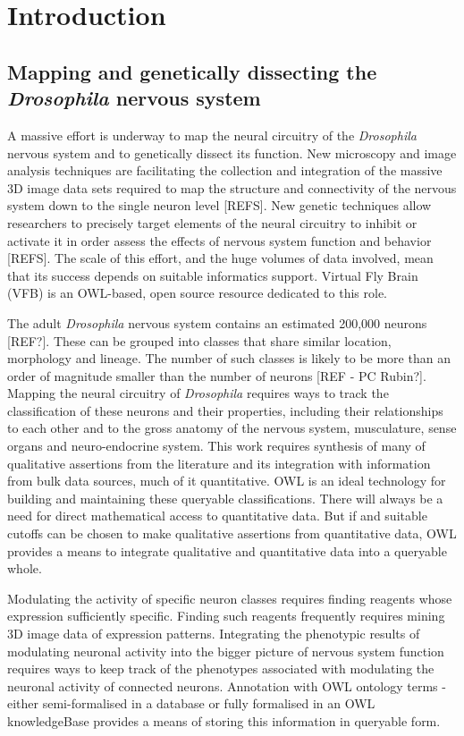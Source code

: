 \documentclass[runningheads,a4paper]{llncs}
\begin{document}
\section{Introduction}


\subsection{Mapping and genetically dissecting the \textit{Drosophila}
  nervous system}

  
A massive effort is underway to map the neural circuitry of the
\textit{Drosophila} nervous system and to genetically dissect its
function. New microscopy and image analysis techniques are
facilitating the collection and integration of the massive 3D image
data sets required to map the structure and connectivity of the
nervous system down to the single neuron level [REFS]. New genetic %
techniques allow researchers to precisely target elements of the
neural circuitry to inhibit or activate it in order assess the effects
of nervous system function and behavior [REFS]. The scale of this %
effort, and the huge volumes of data involved, mean that its success
depends on suitable informatics support. Virtual Fly Brain (VFB)
\cite{pmid22180411,pmid22402613} is an OWL-based, open source
resource dedicated to this role.

The adult \textit{Drosophila} nervous system contains an estimated
200,000 neurons [REF?].  These can be grouped into classes that share
similar location, morphology and lineage.  The number of such classes
is likely to be more than an order of magnitude smaller than the number
of neurons [REF - PC Rubin?].  Mapping the neural circuitry of \textit{Drosophila}
requires ways to track the classification of these neurons and their
properties, including their relationships to each other and to the
gross anatomy of the nervous system, musculature, sense organs and
neuro-endocrine system.  This work requires synthesis of many of
qualitative assertions from the literature and its integration with
information from bulk data sources, much of it quantitative.  OWL
is an ideal technology for building and maintaining these queryable
classifications. There will always be a need for direct mathematical
access to quantitative data.  But if and suitable cutoffs can be
chosen to make qualitative assertions from quantitative data, OWL
provides a means to integrate qualitative and quantitative data into a
queryable whole.

Modulating the activity of specific neuron classes requires finding
reagents whose expression sufficiently specific. Finding such reagents
frequently requires mining 3D image data of expression patterns.
Integrating the phenotypic results of modulating neuronal activity
into the bigger picture of nervous system function requires ways to
keep track of the phenotypes associated with modulating the neuronal
activity of connected neurons.  Annotation with OWL ontology terms -
either semi-formalised in a database or fully formalised in an OWL
knowledgeBase provides a means of storing this information in
queryable form.
\end{document}
